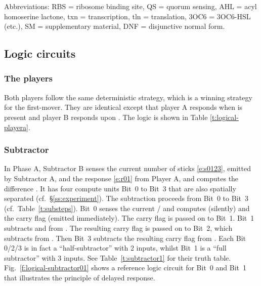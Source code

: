 \documentclass[12pt,notitlepage]{article}
\begin{document}
%
%

Abbreviations:
RBS = ribosome binding site,
QS = quorum sensing,
AHL = acyl homoserine lactone,
txn = transcription,
tln = translation,
{3OC6} = {3OC6}{-}HSL (etc.),
SM = supplementary material,
DNF = disjunctive normal form.



\subsection{Logic circuits}


\subsubsection*{The players} \label{ss:players}

Both players
follow the same deterministic strategy,
which is a winning strategy for the first-mover.
%
They are identical except
that player A responds when  is present
and player B responds upon .
%
The logic is shown in Table \ref{t:logical-playera}.


\subsubsection*{Subtractor} \label{ss:sub}


In Phase A,
Subtractor B 
senses the current number of sticks \eqref{e:s0123},
emitted by Subtractor A,
and 
the response \eqref{e:r01} from Player A,
and
computes the difference .
%
It has four compute units Bit~0 to Bit~3
that are also
spatially separated (cf.~\S\ref{ss:experiment}). 
%
The subtraction proceeds from Bit~0 to Bit~3
(cf.~Table~\ref{t:substeps}).
%
Bit~0 senses the current /
and computes  (silently)
and the carry flag  (emitted immediately).
%
The carry flag is passed on to Bit~1.
%
Bit~1 subtracts  and  from . 
%
The resulting carry flag  
is passed on to Bit~2, 
which subtracts  from .
%
Then Bit~3 subtracts the resulting carry flag
 from .
%
Each Bit 0/2/3
is in fact a ``half-subtractor'' with 2 inputs,
whilst
Bit~1 is a ``full subtractor'' with 3 inputs.
%
%
%
See
Table~\ref{t:subtractor1}
for their truth table.
%
Fig.~\ref{f:logical-subtractor01}
shows a reference logic circuit 
for Bit~0 and Bit~1
that illustrates the principle of delayed response.
\end{document}
